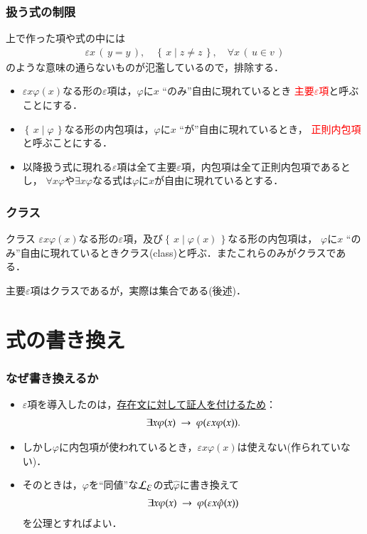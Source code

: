 \documentclass[dvipdfmx,10pt,notheorems]{beamer}
\theoremstyle{definition}
\newcommand{\lang}[1]{\mathcal{L}_{\scalebox{1.2}{$#1$}}} %
\newcommand{\Set}[2]{\left\{\, #1 \mid #2\, \right\}} %
\newcommand{\rarrow}{\hspace{0.25em}\rightarrow\hspace{0.25em}} %
\begin{document}
\begin{frame}\frametitle{扱う式の制限}
	上で作った項や式の中には
	\begin{align}
		\varepsilon x\, (\, y = y\, ),\quad \Set{x}{z \neq z},\quad \forall x\, (\, u \in v\, )
	\end{align}
	のような意味の通らないものが氾濫しているので，排除する．
	
	\begin{itemize}
		\item $\varepsilon x \varphi(x)$なる形の$\varepsilon$項は，$\varphi$に$x$ ``のみ''自由に現れているとき
			\textcolor{red}{主要$\varepsilon$項}と呼ぶことにする．
			
		\item $\Set{x}{\varphi}$なる形の内包項は，$\varphi$に$x$ ``が''自由に現れているとき，
			\textcolor{red}{正則内包項}と呼ぶことにする．
			
		\item 以降扱う式に現れる$\varepsilon$項は全て主要$\varepsilon$項，内包項は全て正則内包項であるとし，
			$\forall x \varphi$や$\exists x \varphi$なる式は$\varphi$に$x$が自由に現れているとする．
	\end{itemize}
\end{frame}

\begin{frame}\frametitle{クラス}
	
	\begin{exampleblock}{クラス}
		$\varepsilon x \varphi(x)$なる形の$\varepsilon$項，及び$\Set{x}{\varphi(x)}$なる形の内包項は，
		$\varphi$に$x$ ``のみ''自由に現れているときクラス(class)と呼ぶ．またこれらのみがクラスである．
	\end{exampleblock}
	
	主要$\varepsilon$項はクラスであるが，実際は集合である(後述)．
	
\end{frame}

\section{式の書き換え}
\begin{frame}\frametitle{なぜ書き換えるか}
	\begin{itemize}
		\item $\varepsilon$項を導入したのは，\underline{存在文に対して証人を付けるため}：
			\begin{align}
				\exists x \varphi(x) \rarrow \varphi(\varepsilon x \varphi(x)).
			\end{align}
			
		\item しかし$\varphi$に内包項が使われているとき，$\varepsilon x \varphi(x)$は使えない(作られていない)．
		
		\item そのときは，$\varphi$を``同値''な$\lang{\varepsilon}$の式$\hat{\varphi}$に書き換えて
			\begin{align}
				\exists x \varphi(x) \rarrow \varphi(\varepsilon x \hat{\varphi}(x))
			\end{align}
			を公理とすればよい．
	\end{itemize}
\end{frame}
\end{document}
